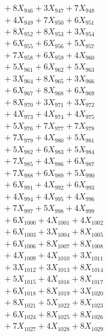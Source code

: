 \documentclass[a4paper,10pt]{article}
\begin{document}
{\begin{align}
&\;  + 8 X_{946} + 3 X_{947} + 7 X_{948} \\[0.3ex]
&\;  + 4 X_{949} + 7 X_{950} + 6 X_{951} \\[0.3ex]
&\;  + 8 X_{952} + 8 X_{953} + 3 X_{954} \\[0.3ex]
&\;  + 6 X_{955} + 6 X_{956} + 5 X_{957} \\[0.3ex]
&\;  + 7 X_{958} + 6 X_{959} + 4 X_{960} \\[0.3ex]
&\;  + 5 X_{961} + 6 X_{962} + 5 X_{963} \\[0.3ex]
&\;  + 3 X_{964} + 8 X_{965} + 3 X_{966} \\[0.3ex]
&\;  + 6 X_{967} + 8 X_{968} + 6 X_{969} \\[0.5ex]\allowbreak
&\;  + 8 X_{970} + 3 X_{971} + 3 X_{972} \\[0.3ex]
&\;  + 4 X_{973} + 4 X_{974} + 4 X_{975} \\[0.3ex]
&\;  + 5 X_{976} + 7 X_{977} + 7 X_{978} \\[0.3ex]
&\;  + 7 X_{979} + 4 X_{980} + 5 X_{981} \\[0.3ex]
&\;  + 5 X_{982} + 6 X_{983} + 5 X_{984} \\[0.3ex]
&\;  + 7 X_{985} + 4 X_{986} + 6 X_{987} \\[0.3ex]
&\;  + 7 X_{988} + 6 X_{989} + 5 X_{990} \\[0.3ex]
&\;  + 6 X_{991} + 4 X_{992} + 6 X_{993} \\[0.3ex]
&\;  + 4 X_{994} + 4 X_{995} + 4 X_{996} \\[0.3ex]
&\;  + 7 X_{997} + 5 X_{998} + 4 X_{999} \\[0.5ex]\allowbreak
&\;  + 6 X_{1000} + 4 X_{1001} + 4 X_{1002} \\[0.3ex]
&\;  + 6 X_{1003} + 3 X_{1004} + 8 X_{1005} \\[0.3ex]
&\;  + 6 X_{1006} + 8 X_{1007} + 8 X_{1008} \\[0.3ex]
&\;  + 4 X_{1009} + 4 X_{1010} + 3 X_{1011} \\[0.3ex]
&\;  + 3 X_{1012} + 3 X_{1013} + 8 X_{1014} \\[0.3ex]
&\;  + 5 X_{1015} + 4 X_{1016} + 8 X_{1017} \\[0.3ex]
&\;  + 6 X_{1018} + 8 X_{1019} + 3 X_{1020} \\[0.3ex]
&\;  + 8 X_{1021} + 5 X_{1022} + 8 X_{1023} \\[0.3ex]
&\;  + 6 X_{1024} + 8 X_{1025} + 8 X_{1026} \\[0.3ex]
&\;  + 7 X_{1027} + 4 X_{1028} + 8 X_{1029} \\[0.5ex]\allowbreak

\end{align}}
\end{document}

